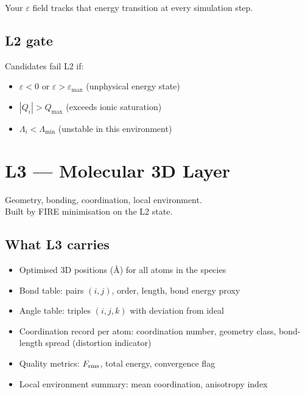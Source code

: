 \documentclass[11pt, a4paper, oneside]{article}
\theoremstyle{definition}
\begin{document}
Your $\varepsilon$ field tracks that energy transition at every simulation step.

\subsection{L2 gate}

Candidates fail L2 if:
\begin{itemize}
  \item $\varepsilon < 0$ or $\varepsilon > \varepsilon_{\max}$ (unphysical energy state)
  \item $|Q_i| > Q_{\max}$ (exceeds ionic saturation)
  \item $\Lambda_i < \Lambda_{\min}$ (unstable in this environment)
\end{itemize}

\section{L3 — Molecular 3D Layer}
\label{sec:l3}

\begin{tcolorbox}[colback=l3col, colframe=green!50!black,
  title={L3 — Molecular 3D},fonttitle=\bfseries\small]
  Geometry, bonding, coordination, local environment.\\
  Built by FIRE minimisation on the L2 state.
\end{tcolorbox}

\subsection{What L3 carries}

\begin{itemize}
  \item Optimised 3D positions (Å) for all atoms in the species
  \item Bond table: pairs $(i,j)$, order, length, bond energy proxy
  \item Angle table: triples $(i,j,k)$ with deviation from ideal
  \item Coordination record per atom: coordination number, geometry class,
        bond-length spread (distortion indicator)
  \item Quality metrics: $F_{\rm rms}$, total energy, convergence flag
  \item Local environment summary: mean coordination, anisotropy index
\end{itemize}
\end{document}

